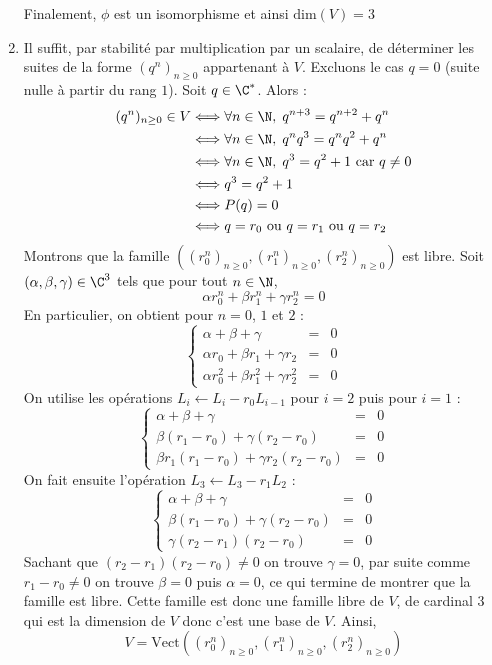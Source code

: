 \documentclass[a4paper,twoside,french,11pt]{VcCours}
\begin{document}
\begin{enumerate}
\noindent Finalement, $\phi$ est un isomorphisme et ainsi $\textrm{dim}(V)=3$
 \item Il suffit, par stabilité par multiplication par un scalaire, de déterminer les suites de la forme $(q^n)_{n \geq 0}$ appartenant à $V$. Excluons le cas $q=0$ (suite nulle à partir du rang $1$). Soit $q\in\C^*$. Alors :
 \begin{align*}
(q^n)_{n \geq 0} \in V & \Longleftrightarrow \forall n\in\N, \; q^{n+3}=q^{n+2}+q^n \\
&\Longleftrightarrow \forall n\in\N, \; q^n q^3=q^{n}q^{2}+q^n \\
&\Longleftrightarrow \forall n\in\N, \; q^3=q^{2}+1 \hbox{ car } q \neq 0 \\
&\Longleftrightarrow  q^3=q^{2}+1  \\
&\Longleftrightarrow P(q)=0 \\
&\Longleftrightarrow q= r_0 \hbox{ ou } q=r_1 \hbox{ ou } q=r_2
\end{align*}
Montrons que la famille $((r_0^n)_{n \geq 0},(r_1^n)_{n \geq 0},(r_2^n)_{n \geq 0})$ est libre. Soit $(\alpha,\beta,\gamma)\in\C^3$ tels que pour tout $n\in\N$, 
$$\alpha r_0^n+\beta r_1^n+\gamma r_2^n=0$$
En particulier, on obtient pour $n=0$, $1$ et $2$ :
$$\left\lbrace\begin{array}{rcl} \alpha+\beta+\gamma&=&0 \\ \alpha r_0+\beta r_1+\gamma r_2&=&0 \\\alpha r_0^2+\beta r_1^2+\gamma r_2^2&=&0\end{array}  \right.$$
On utilise les opérations $L_i\leftarrow L_i-r_0L_{i-1}$ pour $i=2$ puis pour $i=1$ :
$$\left\lbrace\begin{array}{rcl} \alpha+\beta+\gamma&=&0 \\ \beta (r_1-r_0)+\gamma (r_2-r_0)&=&0 \\  \beta r_1(r_1-r_0)+\gamma r_2(r_2-r_0) &=&0\end{array}  \right.$$
On fait ensuite l'opération $L_3\leftarrow L_3-r_1L_2$ : 
$$\left\lbrace\begin{array}{rcl} \alpha+\beta+\gamma&=&0 \\ \beta (r_1-r_0)+\gamma (r_2-r_0)&=&0 \\  \gamma (r_2-r_1)(r_2-r_0) &=&0\end{array}  \right.$$ 
Sachant que $(r_2-r_1)(r_2-r_0)\neq0$ on trouve $\gamma=0$, par suite comme $r_1-r_0\neq 0$ on trouve $\beta=0$ puis $\alpha=0$, ce qui termine de montrer que la famille est libre. Cette famille est donc une famille libre de $V$, de cardinal $3$ qui est la dimension de $V$ donc c'est une base de $V$. Ainsi,
$$V=\textrm{Vect}((r_0^n)_{n \geq 0},(r_1^n)_{n \geq 0},(r_2^n)_{n \geq 0})$$




\end{enumerate}
\end{document}
